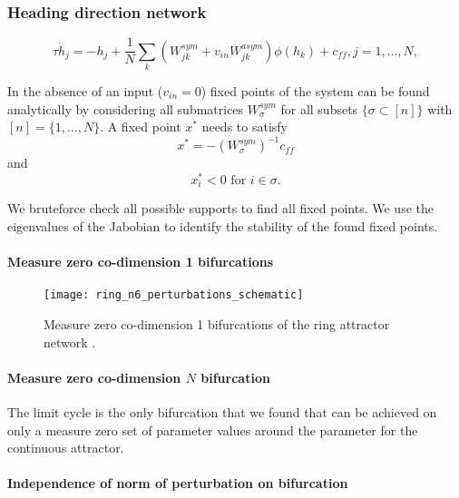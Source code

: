 \documentclass{article} %
\newcounter{ct}
\theoremstyle{definition}
\theoremstyle{remark}
\begin{document}



\subsubsection{Heading direction network}\label{sec:supp:headdirection}

\begin{equation}
\tau \dot h_j = -h_j + \frac{1}{N} \sum_k (W^{sym}_{jk} + v_{in} W^{asym}_{jk})\phi(h_k)+c_{ff},     j=1,\dots,N,
\end{equation}

In the absence of an input ($v_{in}=0$) fixed points of the system can be found analytically by considering all submatrices $W^{sym}_\sigma$ for all subsets $\{\sigma\subset [n]\}$ with$[n]=\{1,\dots, N\}$.
A fixed point $x^*$ needs to satisfy
\begin{equation}
x^*= -(W^{sym}_\sigma)^{-1}c_{ff}
\end{equation}
and 
\begin{equation}
x^*_i<0 \text{   for  	 } i\in\sigma.
\end{equation}

We bruteforce check all possible supports to find all fixed points.
We use the eigenvalues of the Jabobian to identify the stability of the found fixed points.


\paragraph{Measure zero co-dimension 1 bifurcations}

\begin{figure}[tbhp]
     \centering
    \texttt{[image: ring\_n6\_perturbations\_schematic]}
       \caption{Measure zero co-dimension 1 bifurcations of the ring attractor network \citep{Noorman2022}.}
         \label{fig:meaure_zero_perturbations}
\end{figure}


\paragraph{Measure zero co-dimension $N$ bifurcation}
The limit cycle is the only bifurcation that we found that can be achieved on only a measure zero set of parameter values around the parameter for the continuous attractor.






\paragraph{Independence of norm of perturbation on bifurcation}
\end{document}
